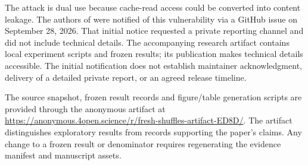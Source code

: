 The attack is dual use because cache-read access could be converted into content leakage. The authors of \scheme{} were notified of this vulnerability via a GitHub issue on September 28, 2026. That initial notice requested a private reporting channel and did not include technical details. The accompanying research artifact contains local experiment scripts and frozen results; its publication makes technical details accessible. The initial notification does not establish maintainer acknowledgment, delivery of a detailed private report, or an agreed release timeline.

The source snapshot, frozen result records and figure/table generation scripts are provided through the anonymous artifact at \url{https://anonymous.4open.science/r/fresh-shuffles-artifact-ED8D/}. The artifact distinguishes exploratory results from records supporting the paper's claims. Any change to a frozen result or denominator requires regenerating the evidence manifest and manuscript assets.
